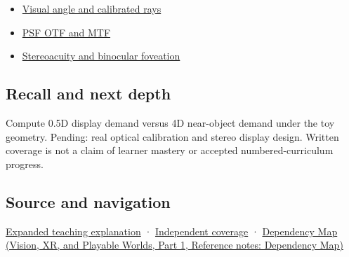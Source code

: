 \hypertarget{appendix-f90cee1be7a4-used-by}{}

\begin{itemize}
\tightlist
\item
  \hyperref[appendix-7d356c396d1a]{Visual angle and calibrated rays}
\item
  \hyperref[appendix-8b76b0efd27f]{PSF OTF and MTF}
\item
  \hyperref[appendix-8dc848f14052]{Stereoacuity and binocular foveation}
\end{itemize}

\subsection{Recall and next depth}\label{appendix-f90cee1be7a4-recall-and-next-depth}

\hypertarget{appendix-f90cee1be7a4-recall-and-next-depth}{}

Compute 0.5D display demand versus 4D near-object demand under the toy geometry. Pending: real optical calibration and stereo display design. Written coverage is not a claim of learner mastery or accepted numbered-curriculum progress.

\subsection{Source and navigation}\label{appendix-f90cee1be7a4-source-and-navigation}

\hypertarget{appendix-f90cee1be7a4-source-and-navigation}{}

\hyperref[04-visual-computing-ii-ch042-focus-and-stereo-can-disagree-even-when-the-images-are-sharp]{Expanded teaching explanation} · \hyperref[appendix-fd090d982a15-xr01---independent-seeing-and-representation-source]{Independent coverage} · \href{../07-Vision-XR-and-Playable-Worlds-P01/main.pdf\#nameddest=appendix-4ad47bdd269a}{Dependency Map (Vision, XR, and Playable Worlds, Part 1, Reference notes: Dependency Map)}
